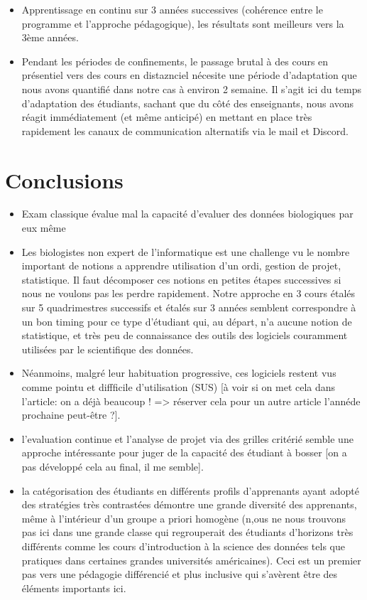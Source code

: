 \documentclass[
]{article}
\begin{document}
\begin{itemize}
\item
  Apprentissage en continu sur 3 années successives (cohérence entre le
  programme et l'approche pédagogique), les résultats sont meilleurs
  vers la 3ème années.
\item
  Pendant les périodes de confinements, le passage brutal à des cours en
  présentiel vers des cours en distaznciel nécesite une période
  d'adaptation que nous avons quantifié dans notre cas à environ 2
  semaine. Il s'agit ici du temps d'adaptation des étudiants, sachant
  que du côté des enseignants, nous avons réagit immédiatement (et même
  anticipé) en mettant en place très rapidement les canaux de
  communication alternatifs via le mail et Discord.
\end{itemize}

\hypertarget{conclusions}{%
\section{Conclusions}\label{conclusions}}

\begin{itemize}
\item
  Exam classique évalue mal la capacité d'evaluer des données
  biologiques par eux même
\item
  Les biologistes non expert de l'informatique est une challenge vu le
  nombre important de notions a apprendre utilisation d'un ordi, gestion
  de projet, statistique. Il faut décomposer ces notions en petites
  étapes successives si nous ne voulons pas les perdre rapidement. Notre
  approche en 3 cours étalés sur 5 quadrimestres successifs et étalés
  sur 3 années semblent correspondre à un bon timing pour ce type
  d'étudiant qui, au départ, n'a aucune notion de statistique, et très
  peu de connaissance des outils des logiciels couramment utilisées par
  le scientifique des données.
\item
  Néanmoins, malgré leur habituation progressive, ces logiciels restent
  vus comme pointu et diffficile d'utilisation (SUS) {[}à voir si on met
  cela dans l'article: on a déjà beaucoup ! =\textgreater{} réserver
  cela pour un autre article l'annéde prochaine peut-être ?{]}.
\item
  l'evaluation continue et l'analyse de projet via des grilles critérié
  semble une approche intéressante pour juger de la capacité des
  étudiant à bosser {[}on a pas développé cela au final, il me
  semble{]}.
\item
  la catégorisation des étudiants en différents profils d'apprenants
  ayant adopté des stratégies très contrastées démontre une grande
  diversité des apprenants, même à l'intérieur d'un groupe a priori
  homogène (n,ous ne nous trouvons pas ici dans une grande classe qui
  regrouperait des étudiants d'horizons très différents comme les cours
  d'introduction à la science des données tels que pratiques dans
  certaines grandes universités américaines). Ceci est un premier pas
  vers une pédagogie différencié et plus inclusive qui s'avèrent être
  des éléments importants ici.
\end{itemize}
\end{document}
